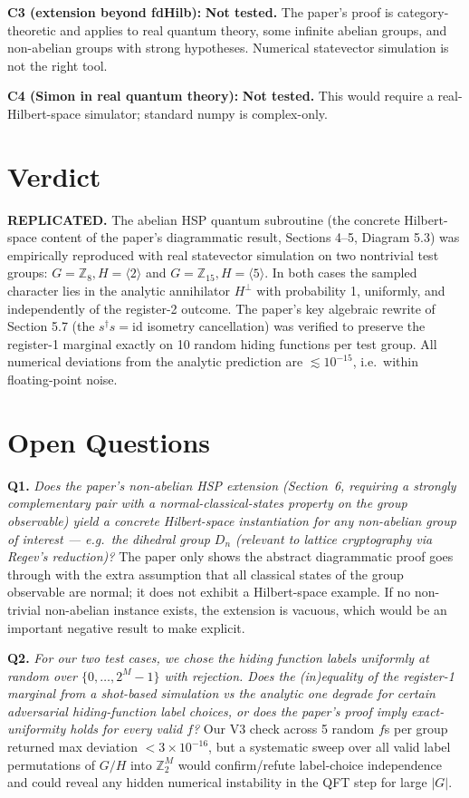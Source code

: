 \documentclass[11pt]{article}
\begin{document}
\textbf{C3 (extension beyond fdHilb):} \textbf{Not tested.}
The paper's proof is category-theoretic and applies to real quantum theory, some infinite
abelian groups, and non-abelian groups with strong hypotheses. Numerical statevector
simulation is not the right tool.

\textbf{C4 (Simon in real quantum theory):} \textbf{Not tested.}
This would require a real-Hilbert-space simulator; standard numpy is complex-only.

\section{Verdict}

\textbf{REPLICATED.} The abelian HSP quantum subroutine (the concrete Hilbert-space content of
the paper's diagrammatic result, Sections 4--5, Diagram 5.3) was empirically reproduced with
real statevector simulation on two nontrivial test groups: $G=\mathbb{Z}_8, H=\langle 2\rangle$
and $G=\mathbb{Z}_{15}, H=\langle 5\rangle$. In both cases the sampled character lies in the
analytic annihilator $H^\perp$ with probability 1, uniformly, and independently of the register-2
outcome. The paper's key algebraic rewrite of Section 5.7 (the $s^\dagger s = \mathrm{id}$
isometry cancellation) was verified to preserve the register-1 marginal exactly on 10 random
hiding functions per test group. All numerical deviations from the analytic prediction are
$\lesssim 10^{-15}$, i.e.\ within floating-point noise.

\section{Open Questions}

\textbf{Q1.} \emph{Does the paper's non-abelian HSP extension (Section~6, requiring a strongly
complementary pair with a normal-classical-states property on the group observable) yield a
concrete Hilbert-space instantiation for any non-abelian group of interest --- e.g.\ the
dihedral group $D_n$ (relevant to lattice cryptography via Regev's reduction)?}
The paper only shows the abstract diagrammatic proof goes through with the extra assumption
that all classical states of the group observable are normal; it does not exhibit a Hilbert-space
example. If no non-trivial non-abelian instance exists, the extension is vacuous, which would
be an important negative result to make explicit.

\textbf{Q2.} \emph{For our two test cases, we chose the hiding function labels uniformly at
random over $\{0,\ldots,2^M-1\}$ with rejection. Does the (in)equality of the register-1
marginal from a shot-based simulation vs the analytic one degrade for certain adversarial
hiding-function label choices, or does the paper's proof imply exact-uniformity holds for
\emph{every} valid $f$?} Our V3 check across 5 random $f$s per group returned max deviation
$<3\times 10^{-16}$, but a systematic sweep over all valid label permutations of $G/H$ into
$\mathbb{Z}_2^M$ would confirm/refute label-choice independence and could reveal any
hidden numerical instability in the QFT step for large $|G|$.
\end{document}
